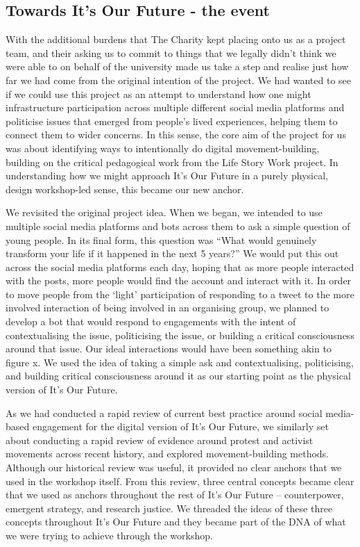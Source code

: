 \subsection{Towards It's Our Future - the event}

With the additional burdens that The Charity kept placing onto us as a project team, and their asking us to commit to things that we legally didn’t think we were able to on behalf of the university made us take a step and realise just how far we had come from the original intention of the project. We had wanted to see if we could use this project as an attempt to understand how one might infrastructure participation across multiple different social media platforms and politicise issues that emerged from people’s lived experiences, helping them to connect them to wider concerns. In this sense, the core aim of the project for us was about identifying ways to intentionally do digital movement-building, building on the critical pedagogical work from the Life Story Work project. In understanding how we might approach It’s Our Future in a purely physical, design workshop-led sense, this became our new anchor. 

We revisited the original project idea. When we began, we intended to use multiple social media platforms and bots across them to ask a simple question of young people. In its final form, this question was “What would genuinely transform your life if it happened in the next 5 years?” We would put this out across the social media platforms each day, hoping that as more people interacted with the posts, more people would find the account and interact with it. In order to move people from the ‘light’ participation of responding to a tweet to the more involved interaction of being involved in an organising group, we planned to develop a bot that would respond to engagements with the intent of contextualising the issue, politicising the issue, or building a critical consciousness around that issue. Our ideal interactions would have been something akin to figure x. We used the idea of taking a simple ask and contextualising, politicising, and building critical consciousness around it as our starting point as the physical version of It’s Our Future. 

As we had conducted a rapid review of current best practice around social media-based engagement for the digital version of It’s Our Future, we similarly set about conducting a rapid review of evidence around protest and activist movements across recent history, and explored movement-building methods. Although our historical review was useful, it provided no clear anchors that we used in the workshop itself. From this review, three central concepts became clear that we used as anchors throughout the rest of It’s Our Future – counterpower, emergent strategy, and research justice. We threaded the ideas of these three concepts throughout It’s Our Future and they became part of the DNA of what we were trying to achieve through the workshop. 

